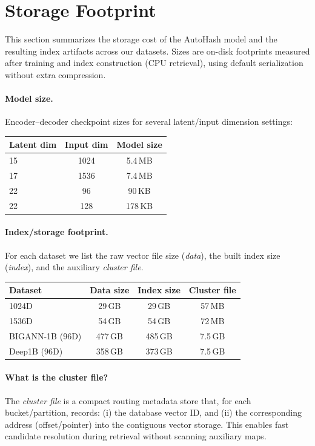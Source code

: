 \documentclass[sigconf,anonymous]{acmart}
\begin{document}
\section{Storage Footprint}
\label{app:storage}
 
This section summarizes the storage cost of the AutoHash model and the resulting index artifacts across our datasets. Sizes are on-disk footprints measured after training and index construction (CPU retrieval), using default serialization without extra compression.
 
\paragraph{Model size.}
Encoder--decoder checkpoint sizes for several latent/input dimension settings:
\begin{table}[h]
\centering
\begin{tabular}{lcc}
\toprule
Latent dim & Input dim & Model size \\
\midrule
15 & 1024 & 5.4\,MB \\
17 & 1536 & 7.4\,MB \\
22 & 96   & 90\,KB \\
22 & 128  & 178\,KB \\
\bottomrule
\end{tabular}
\end{table}
 
\paragraph{Index/storage footprint.}
For each dataset we list the raw vector file size (\emph{data}), the built index size (\emph{index}), and the auxiliary \emph{cluster file}.
\begin{table}[h]
\centering
\begin{tabular}{lccc}
\toprule
Dataset & Data size & Index size & Cluster file \\
\midrule
1024D              & 29\,GB  & 29\,GB  & 57\,MB \\
1536D              & 54\,GB  & 54\,GB  & 72\,MB \\
BIGANN-1B (96D)    & 477\,GB & 485\,GB & 7.5\,GB \\
Deep1B (96D)       & 358\,GB & 373\,GB & 7.5\,GB \\
\bottomrule
\end{tabular}
\end{table}
 
\paragraph{What is the cluster file?}
The \emph{cluster file} is a compact routing metadata store that, for each bucket/partition, records:
(i) the database vector ID, and
(ii) the corresponding address (offset/pointer) into the contiguous vector storage.
This enables fast candidate resolution during retrieval without scanning auxiliary maps.
 
\end{document}
